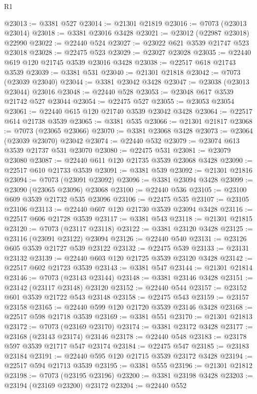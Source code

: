 \begin{lexlean}{R1}
\begin{coremodule}
@23013 := @3381 @527
@23014 := @21301 @21819
@23016 := @7073 (@23013 @23014)
@23018 := @3381 @23016 @3428
@23021 := @23012 (@22987 @23018) @22990
@23022 := @22440 @524
@23027 := @23022 @621 @3539 @21747 @523 @23018
@23028 := @22475 @523
@23029 := @23027 @23028
@23035 := @22440 @619 @120 @21745 @3539 @23016 @3428
@23038 := @22517 @618 @21743 @3539
@23039 := @3381 @531
@23040 := @21301 @21818
@23042 := @7073 (@23039 @23040)
@23044 := @3381 @23042 @3428
@23047 := @23038 (@23013 @23044) @23016
@23048 := @22440 @528
@23053 := @23048 @617 @3539 @21742 @527 @23044
@23054 := @22475 @527
@23055 := @23053 @23054
@23061 := @22440 @615 @120 @21740 @3539 @23042 @3428
@23064 := @22517 @614 @21738 @3539
@23065 := @3381 @535
@23066 := @21301 @21817
@23068 := @7073 (@23065 @23066)
@23070 := @3381 @23068 @3428
@23073 := @23064 (@23039 @23070) @23042
@23074 := @22440 @532
@23079 := @23074 @613 @3539 @21737 @531 @23070
@23080 := @22475 @531
@23081 := @23079 @23080
@23087 := @22440 @611 @120 @21735 @3539 @23068 @3428
@23090 := @22517 @610 @21733 @3539
@23091 := @3381 @539
@23092 := @21301 @21816
@23094 := @7073 (@23091 @23092)
@23096 := @3381 @23094 @3428
@23099 := @23090 (@23065 @23096) @23068
@23100 := @22440 @536
@23105 := @23100 @609 @3539 @21732 @535 @23096
@23106 := @22475 @535
@23107 := @23105 @23106
@23113 := @22440 @607 @120 @21730 @3539 @23094 @3428
@23116 := @22517 @606 @21728 @3539
@23117 := @3381 @543
@23118 := @21301 @21815
@23120 := @7073 (@23117 @23118)
@23122 := @3381 @23120 @3428
@23125 := @23116 (@23091 @23122) @23094
@23126 := @22440 @540
@23131 := @23126 @605 @3539 @21727 @539 @23122
@23132 := @22475 @539
@23133 := @23131 @23132
@23139 := @22440 @603 @120 @21725 @3539 @23120 @3428
@23142 := @22517 @602 @21723 @3539
@23143 := @3381 @547
@23144 := @21301 @21814
@23146 := @7073 (@23143 @23144)
@23148 := @3381 @23146 @3428
@23151 := @23142 (@23117 @23148) @23120
@23152 := @22440 @544
@23157 := @23152 @601 @3539 @21722 @543 @23148
@23158 := @22475 @543
@23159 := @23157 @23158
@23165 := @22440 @599 @120 @21720 @3539 @23146 @3428
@23168 := @22517 @598 @21718 @3539
@23169 := @3381 @551
@23170 := @21301 @21813
@23172 := @7073 (@23169 @23170)
@23174 := @3381 @23172 @3428
@23177 := @23168 (@23143 @23174) @23146
@23178 := @22440 @548
@23183 := @23178 @597 @3539 @21717 @547 @23174
@23184 := @22475 @547
@23185 := @23183 @23184
@23191 := @22440 @595 @120 @21715 @3539 @23172 @3428
@23194 := @22517 @594 @21713 @3539
@23195 := @3381 @555
@23196 := @21301 @21812
@23198 := @7073 (@23195 @23196)
@23200 := @3381 @23198 @3428
@23203 := @23194 (@23169 @23200) @23172
@23204 := @22440 @552

\end{coremodule}
\end{lexlean}
